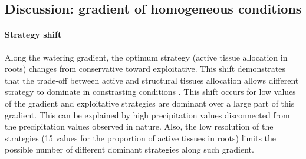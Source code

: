 \subsection{Discussion: gradient of homogeneous conditions}

\paragraph{Strategy shift}
Along the watering gradient, the optimum strategy (active tissue allocation in roots) changes from conservative toward exploitative. This shift demonstrates that the trade-off between active and structural tissues allocation allows different strategy to dominate in constrasting conditions \parencite{wright_worldwide_2006}. This shift occurs for low values of the gradient and exploitative strategies are dominant over a large part of this gradient. This can be explained by high precipitation values disconnected from the precipitation values observed in nature. Also, the low resolution of the strategies (15 values for the proportion of active tissues in roots) limits the possible number of different dominant strategies along such gradient. 

%

